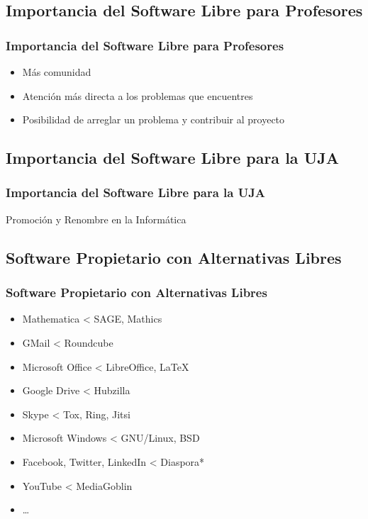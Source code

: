 \documentclass[xetex, mathserif, serif]{beamer}
\begin{document}

\subsection{Importancia del Software Libre para Profesores}
\begin{frame}[t]
    \frametitle{Importancia del Software Libre para Profesores}
    \pause{}
    \begin{itemize}[<+->]
        \item Más comunidad
        \item Atención más directa a los problemas que encuentres
        \item Posibilidad de arreglar un problema y contribuir al proyecto
    \end{itemize}
\end{frame}


\subsection{Importancia del Software Libre para la UJA}
\begin{frame}
    \frametitle{Importancia del Software Libre para la UJA}
    \pause{}
    \centering \Large Promoción y Renombre en la Informática
\end{frame}


\subsection{Software Propietario con Alternativas Libres}
\begin{frame}
    \frametitle{Software Propietario con Alternativas Libres}
    \pause{}
    \begin{itemize}[<+->]
        \item Mathematica < SAGE, Mathics
        \item GMail < Roundcube
        \item Microsoft Office < LibreOffice, \LaTeX{}
        \item Google Drive < Hubzilla
        \item Skype < Tox, Ring, Jitsi
        \item Microsoft Windows < GNU/Linux, BSD
        \item Facebook, Twitter, LinkedIn < Diaspora*
        \item YouTube < MediaGoblin
        \item \ldots
    \end{itemize}
\end{frame}
\end{document}
